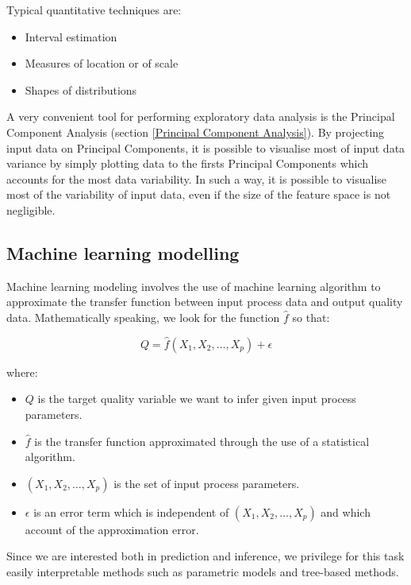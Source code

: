 Typical quantitative techniques are:

\begin{itemize}
    \item Interval estimation
    \item Measures of location or of scale
    \item Shapes of distributions
\end{itemize}

A very convenient tool for performing exploratory data analysis is the Principal Component Analysis (section \ref{Principal Component Analysis}). By projecting input data on Principal Components, it is possible to visualise most of input data variance by simply plotting data to the firsts Principal Components which accounts for the most data variability. In such a way, it is possible to visualise most of the variability of input data, even if the size of the feature space is not negligible. 

\subsection{Machine learning modelling} \label{Machine Learning modeling}

Machine learning modeling involves the use of machine learning algorithm to approximate the transfer function between input process data and output quality data. Mathematically speaking, we look for the function $\hat{f}$ so that:

\begin{equation}
    Q = \hat{f}(X_1,X_2,\ldots,X_p) + \epsilon
\end{equation}

where:

\begin{itemize}
    \item $Q$ is the target quality variable we want to infer given input process parameters.
    \item $\hat{f}$ is the transfer function approximated through the use of a statistical algorithm.
    \item $(X_1,X_2,\ldots,X_p)$ is the set of input process parameters.
    \item $\epsilon$ is an error term which is independent of $(X_1,X_2,\ldots,X_p)$ and which account of the approximation error. 
\end{itemize}

Since we are interested both in prediction and inference, we privilege for this task easily interpretable methods such as parametric models and tree-based methods. 

